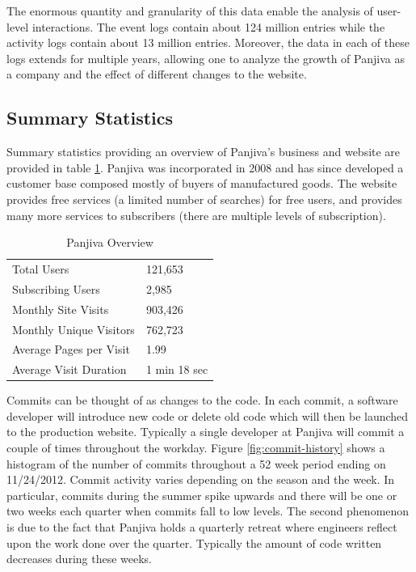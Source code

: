 \documentclass[10pt]{report}
\begin{document}
The enormous quantity and granularity of this data enable the analysis of user-level interactions. The event logs contain about 124 million entries while the activity logs contain about 13 million entries. Moreover, the data in each of these logs extends for multiple years, allowing one to analyze the growth of Panjiva as a company and the effect of different changes to the website.

\subsection{Summary Statistics}

Summary statistics providing an overview of Panjiva's business and website are provided in table \ref{table:panjiva-overview}. Panjiva was incorporated in 2008 and has since developed a customer base composed mostly of buyers of manufactured goods. The website provides free services (a limited number of searches) for free users, and provides many more services to subscribers (there are multiple levels of subscription). 

\begin{table}[h!]
\centering
\caption{Panjiva Overview}
\begin{tabular}{l || l}
\hline
Total Users & 121,653 \\
Subscribing Users & 2,985 \\
Monthly Site Visits & 903,426 \\
Monthly Unique Visitors & 762,723 \\
Average Pages per Visit & 1.99 \\
Average Visit Duration & 1 min 18 sec \\
\hline
\end{tabular}
\label{table:panjiva-overview}
\end{table}

Commits can be thought of as changes to the code. In each commit, a software developer will introduce new code or delete old code which will then be launched to the production website. Typically a single developer at Panjiva will commit a couple of times throughout the workday. Figure \ref{fig:commit-history} shows a histogram of the number of commits throughout a 52 week period ending on 11/24/2012. Commit activity varies depending on the season and the week. In particular, commits during the summer spike upwards and there will be one or two weeks each quarter when commits fall to low levels. The second phenomenon is due to the fact that Panjiva holds a quarterly retreat where engineers reflect upon the work done over the quarter. Typically the amount of code written decreases during these weeks. 
\end{document}
